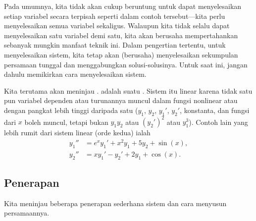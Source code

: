 Pada umumnya, kita tidak akan cukup beruntung untuk dapat menyelesaikan
setiap variabel secara terpisah seperti dalam
contoh tersebut---kita perlu menyelesaikan semua variabel sekaligus.
Walaupun kita tidak selalu dapat menyelesaikan satu variabel demi satu,
kita akan berusaha mempertahankan sebanyak mungkin manfaat teknik ini.
Dalam pengertian tertentu, untuk menyelesaikan sistem, kita tetap akan (berusaha) menyelesaikan
sekumpulan persamaan tunggal dan menggabungkan solusi-solusinya.
Untuk saat ini, jangan dahulu memikirkan cara menyelesaikan sistem.

Kita terutama akan meninjau \emph{}.
adalah suatu \emph{}.
Sistem itu linear karena tidak satu pun variabel dependen atau turunannya
muncul dalam fungsi nonlinear atau dengan pangkat
lebih tinggi daripada satu ($y_1$, $y_2$, $y_1'$, $y_2'$, konstanta, dan fungsi dari $x$
boleh muncul, tetapi bukan $y_1y_2$ atau ${(y_2')}^2$ atau $y_1^3$).
Contoh lain yang lebih
rumit dari sistem linear (orde kedua) ialah
\begin{equation*}
\begin{aligned}
y_1'' &= e^x y_1' + x^2 y_1 + 5 y_2 + \sin(x), \\
y_2'' &= x y_1'-y_2' + 2 y_1 + \cos(x).
\end{aligned}
\end{equation*}

\subsection{Penerapan}

Kita meninjau beberapa penerapan sederhana sistem dan cara menyusun
persamaannya.

